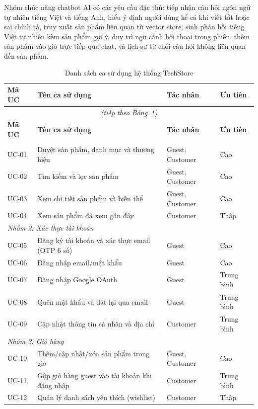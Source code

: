Nhóm chức năng chatbot AI có các yêu cầu đặc thù: tiếp nhận câu hỏi ngôn ngữ tự nhiên tiếng Việt và tiếng Anh, hiểu ý định người dùng kể cả khi viết tắt hoặc sai chính tả, truy xuất sản phẩm liên quan từ vector store, sinh phản hồi tiếng Việt tự nhiên kèm sản phẩm gợi ý, duy trì ngữ cảnh hội thoại trong phiên, thêm sản phẩm vào giỏ trực tiếp qua chat, và lịch sự từ chối câu hỏi không liên quan đến sản phẩm.

\begin{longtable}{|l|p{6cm}|p{3.5cm}|l|}
  \caption{Danh sách ca sử dụng hệ thống TechStore}
  \label{tab:use_cases} \\
  \hline
  \textbf{Mã UC} & \textbf{Tên ca sử dụng} & \textbf{Tác nhân} & \textbf{Ưu tiên} \\
  \hline
  \endfirsthead
  \multicolumn{4}{c}{\textit{(tiếp theo Bảng~\ref{tab:use_cases})}} \\
  \hline
  \textbf{Mã UC} & \textbf{Tên ca sử dụng} & \textbf{Tác nhân} & \textbf{Ưu tiên} \\
  \hline
  \endhead
  \hline
  \endfoot

  \multicolumn{4}{|l|}{\textit{Nhóm 1: Duyệt và tìm kiếm sản phẩm}} \\
  \hline
  UC-01 & Duyệt sản phẩm, danh mục và thương hiệu & Guest, Customer & Cao \\
  \hline
  UC-02 & Tìm kiếm và lọc sản phẩm & Guest, Customer & Cao \\
  \hline
  UC-03 & Xem chi tiết sản phẩm và biến thể & Guest, Customer & Cao \\
  \hline
  UC-04 & Xem sản phẩm đã xem gần đây & Customer & Thấp \\
  \hline

  \multicolumn{4}{|l|}{\textit{Nhóm 2: Xác thực tài khoản}} \\
  \hline
  UC-05 & Đăng ký tài khoản và xác thực email (OTP 6 số) & Guest & Cao \\
  \hline
  UC-06 & Đăng nhập email/mật khẩu & Guest & Cao \\
  \hline
  UC-07 & Đăng nhập Google OAuth & Guest & Trung bình \\
  \hline
  UC-08 & Quên mật khẩu và đặt lại qua email & Guest & Trung bình \\
  \hline
  UC-09 & Cập nhật thông tin cá nhân và địa chỉ & Customer & Trung bình \\
  \hline

  \multicolumn{4}{|l|}{\textit{Nhóm 3: Giỏ hàng}} \\
  \hline
  UC-10 & Thêm/cập nhật/xóa sản phẩm trong giỏ & Guest, Customer & Cao \\
  \hline
  UC-11 & Gộp giỏ hàng guest vào tài khoản khi đăng nhập & Customer & Trung bình \\
  \hline
  UC-12 & Quản lý danh sách yêu thích (wishlist) & Customer & Thấp \\
  \hline


\end{longtable}
